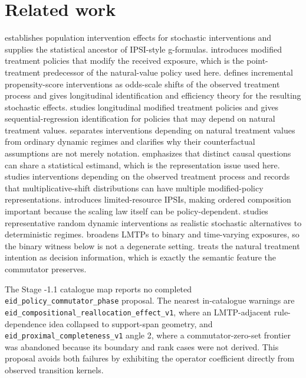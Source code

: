 \documentclass[11pt]{article}
\theoremstyle{definition}
\theoremstyle{plain}
\theoremstyle{remark}
\begin{document}
\section{Related work}
\citet{DiazVanDerLaan2012Biometrics} establishes population intervention effects for stochastic interventions and supplies the statistical ancestor of IPSI-style g-formulas. \citet{HaneuseRotnitzky2013StatMed} introduces modified treatment policies that modify the received exposure, which is the point-treatment predecessor of the natural-value policy used here. \citet{Kennedy2019JASA} defines incremental propensity-score interventions as odds-scale shifts of the observed treatment process and gives longitudinal identification and efficiency theory for the resulting stochastic effects. \citet{DiazWilliamsHoffmanSchenck2023JASA} studies longitudinal modified treatment policies and gives sequential-regression identification for policies that may depend on natural treatment values. \citet{YoungHernanRobins2014EM} separates interventions depending on natural treatment values from ordinary dynamic regimes and clarifies why their counterfactual assumptions are not merely notation. \citet{VanDerLaanLuedtkeDiaz2014EM} emphasizes that distinct causal questions can share a statistical estimand, which is the representation issue used here. \citet{WenMarcusYoung2023SMMR} studies interventions depending on the observed treatment process and records that multiplicative-shift distributions can have multiple modified-policy representations. \citet{SarvetWanisYoungHernandezAlejandroStensrud2023Biometrics} introduces limited-resource IPSIs, making ordered composition important because the scaling law itself can be policy-dependent. \citet{YoungLoganRobinsHernan2019JASA} studies representative random dynamic interventions as realistic stochastic alternatives to deterministic regimes. \citet{HoffmanSalazarBarretoWilliamsRudolphDiaz2024Epidemiology} broadens LMTPs to binary and time-varying exposures, so the binary witness below is not a degenerate setting. \citet{StensrudLaurendeauSarvet2024Biometrika} treats the natural treatment intention as decision information, which is exactly the semantic feature the commutator preserves.

The Stage -1.1 catalogue map reports no completed \texttt{eid\_policy\_commutator\_phase} proposal. The nearest in-catalogue warnings are \texttt{eid\_compositional\_reallocation\_effect\_v1}, where an LMTP-adjacent rule-dependence idea collapsed to support-span geometry, and \texttt{eid\_proximal\_completeness\_v1} angle 2, where a commutator-zero-set frontier was abandoned because its boundary and rank cases were not derived. This proposal avoids both failures by exhibiting the operator coefficient directly from observed transition kernels.
\end{document}
